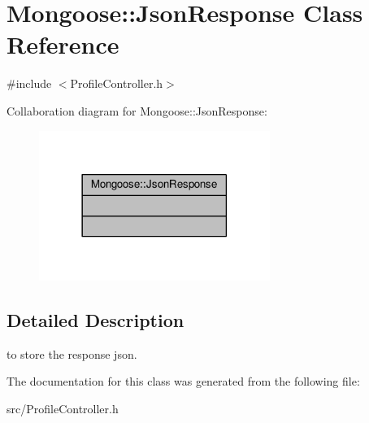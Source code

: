 \hypertarget{classMongoose_1_1JsonResponse}{}\section{Mongoose\+:\+:Json\+Response Class Reference}
\label{classMongoose_1_1JsonResponse}


{\ttfamily \#include $<$Profile\+Controller.\+h$>$}



Collaboration diagram for Mongoose\+:\+:Json\+Response\+:
\nopagebreak
\begin{figure}[H]
\begin{center}
\leavevmode
\includegraphics[width=213pt]{d2/d27/classMongoose_1_1JsonResponse__coll__graph}
\end{center}
\end{figure}


\subsection{Detailed Description}
to store the response json. 

The documentation for this class was generated from the following file\+:\begin{DoxyCompactItemize}
\item 
src/Profile\+Controller.\+h\end{DoxyCompactItemize}
